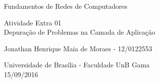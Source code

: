 \begin{titlepage}
\begin{center}

	{\LARGE Fundamentos de Redes de Computadores}
	\\
	\vspace*{\fill}

	{\LARGE Atividade Extra 01 \\ \vspace{0.3in} Depuração de Problemas na Camada de Aplicação}
	\\
	\vspace*{\fill}

	{\large Jonathan Henrique Maia de Moraes - 12/0122553}

	\vspace{1in}

	{\large Universidade de Brasília - Faculdade UnB Gama
	\\ 15/09/2016}
\end{center}
\end{titlepage}
